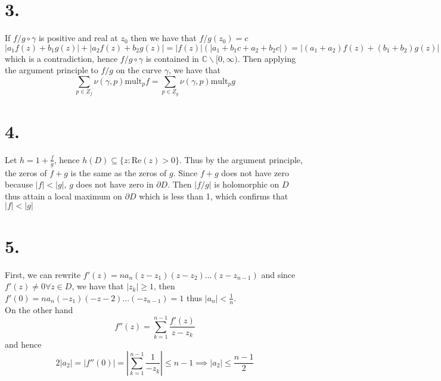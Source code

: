 \documentclass[11pt]{article}
\begin{document}
\section*{3.}
If $f/g \circ \gamma$ is positive and real at $z_0$ then we have that $f/g(z_0) = c$
\[
    |a_1f(z) + b_1g(z)| + |a_2f(z) + b_2g(z)| = |f(z)|(|a_1 + b_1c + a_2 + b_2c|) = |(a_1 + a_2)f(z) + (b_1 + b_2)g(z)|
\]
which is a contradiction, hence $f/g \circ \gamma$ is contained in $\mathbb{C} \backslash [0, \infty)$.
Then applying the argument principle to $f/g$ on the curve $\gamma$, we have that 
\[
    \sum_{p \in Z_f} \nu(\gamma, p) \text{mult}_p f = \sum_{p \in Z_g} \nu(\gamma, p) \text{mult}_p g
\]
\newpage
\section*{4.}
Let $h = 1 + \frac{f}{g}$, hence $h(D) \subseteq \{z: \text{Re}(z)> 0\}$. Thus by the argument principle, the zeros of $f+g$ is the same as the zeros of $g$. 
Since $f+g$ does not have zero because $|f|<|g|$, $g$ does not have zero in $\partial D$. Then $|f/g|$ is holomorphic on $D$ thus attain a local maximum on $\partial D$ which is less than 1, which confirms that $|f|<|g|$
\newpage
\section*{5.}
First, we can rewrite $f'(z) = n a_n(z-z_1)(z-z_2)\hdots(z-z_{n-1})$ and since $f'(z) \ne 0 \forall z \in D$, we have that $|z_k|\ge1$, 
then $f'(0) = n a_n(-z_1)(-z-2)\hdots (-z_{n-1}) = 1$ thus $|a_n| < \frac{1}{n}$. \\
On the other hand 
\[
    f''(z) = \sum_{k=1}^{n-1} \frac{f'(z)}{z-z_k}
\]
and hence 
\[
    2|a_2| = |f''(0)| = \left|\sum_{k=1}^{n-1} \frac{1}{-z_k} \right| \le n-1 \implies |a_2| \le \frac{n-1}{2}
\]
\end{document}
